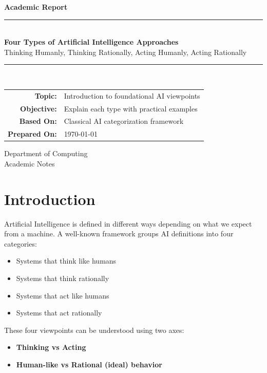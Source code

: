 \documentclass[12pt,a4paper]{article}
\begin{document}
\begin{titlepage}
\centering
\vspace*{0.5cm}
{\Large\color{primary}\textbf{Academic Report}}\\[0.3cm]
\rule{\textwidth}{1.8pt}\\[0.5cm]
{\Huge\bfseries\color{primary}Four Types of Artificial Intelligence Approaches}\\[0.2cm]
{\Large Thinking Humanly, Thinking Rationally, Acting Humanly, Acting Rationally}\\[0.4cm]
\rule{\textwidth}{1.8pt}\\[1.0cm]

\begin{tabular}{rl}
\textbf{Topic:} & Introduction to foundational AI viewpoints \\
\textbf{Objective:} & Explain each type with practical examples \\
\textbf{Based On:} & Classical AI categorization framework \\
\textbf{Prepared On:} & \today
\end{tabular}

\vfill
{\large Department of Computing}\\
{\large Academic Notes}
\end{titlepage}

\tableofcontents
\newpage

\section{Introduction}

Artificial Intelligence is defined in different ways depending on what we expect from a machine.
A well-known framework groups AI definitions into four categories:
\begin{itemize}[noitemsep]
    \item Systems that think like humans
    \item Systems that think rationally
    \item Systems that act like humans
    \item Systems that act rationally
\end{itemize}

These four viewpoints can be understood using two axes:
\begin{itemize}[noitemsep]
    \item \textbf{Thinking vs Acting}
    \item \textbf{Human-like vs Rational (ideal) behavior}
\end{itemize}
\end{document}
